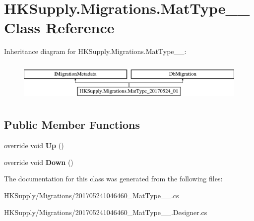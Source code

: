 \hypertarget{class_h_k_supply_1_1_migrations_1_1_mat_type__20170524__01}{}\section{H\+K\+Supply.\+Migrations.\+Mat\+Type\+\_\+\_ Class Reference}
\label{class_h_k_supply_1_1_migrations_1_1_mat_type__20170524__01}
Inheritance diagram for H\+K\+Supply.\+Migrations.\+Mat\+Type\+\_\+\_\+:\begin{figure}[H]
\begin{center}
\leavevmode
\includegraphics[height=2.000000cm]{class_h_k_supply_1_1_migrations_1_1_mat_type__20170524__01}
\end{center}
\end{figure}
\subsection*{Public Member Functions}
\begin{DoxyCompactItemize}
\item 
\mbox{\label{class_h_k_supply_1_1_migrations_1_1_mat_type__20170524__01_a7ad7426b9d2758c7129899fbf72ce33b}} 
override void {\bfseries Up} ()
\item 
\mbox{\label{class_h_k_supply_1_1_migrations_1_1_mat_type__20170524__01_a510951034132efa8acadcc6edca2b88d}} 
override void {\bfseries Down} ()
\end{DoxyCompactItemize}


The documentation for this class was generated from the following files\+:\begin{DoxyCompactItemize}
\item 
H\+K\+Supply/\+Migrations/201705241046460\+\_\+\+Mat\+Type\+\_\+\_.\+cs\item 
H\+K\+Supply/\+Migrations/201705241046460\+\_\+\+Mat\+Type\+\_\+\_.\+Designer.\+cs\end{DoxyCompactItemize}
